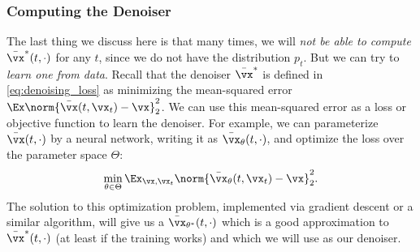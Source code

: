 \documentclass[../../book-main.tex]{subfiles}
\begin{document}
\subsubsection{Computing the Denoiser}
The last thing we discuss here is that many times, we will \textit{not be able to compute} \(\bar{\vx}^{\ast}(t, \cdot)\) for any \(t\), since we do not have the distribution \(p_{t}\). But we can try to \textit{learn one from data}. Recall that the denoiser \(\bar{\vx}^{\ast}\) is defined in \eqref{eq:denoising_loss} as minimizing the mean-squared error \(\Ex\norm{\bar{\vx}(t, \vx_{t}) - \vx}_{2}^{2}\). We can use this mean-squared error as a loss or objective function to learn the denoiser. For example, we can parameterize \(\bar{\vx}(t, \cdot)\) by a neural network, writing it as \(\bar{\vx}_{\theta}(t, \cdot)\), and optimize the loss over the parameter space \(\Theta\):
\begin{equation}
	\min_{\theta \in \Theta}\Ex_{\vx, \vx_{t}}\norm{\bar{\vx}_{\theta}(t, \vx_{t}) - \vx}_{2}^{2}.
\end{equation}
The solution to this optimization problem, implemented via gradient descent or a similar algorithm, will give us a \(\bar{\vx}_{\theta^{\ast}}(t, \cdot)\) which is a good approximation to \(\bar{\vx}^{\ast}(t, \cdot)\) (at least if the training works) and which we will use as our denoiser.
\end{document}
